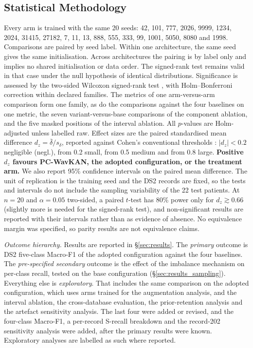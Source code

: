\documentclass[preprint,12pt]{elsarticle}
\begin{document}
\subsection{Statistical Methodology}
\label{sec:stats}
Every arm is trained with the same 20 seeds: 42, 101, 777, 2026, 9999, 1234, 2024, 31415, 27182, 7, 11, 13, 888, 555, 333, 99, 1001, 5050, 8080 and 1998. Comparisons are paired by seed label. Within one architecture, the same seed gives the same initialisation. Across architectures the pairing is by label only and implies no shared initialisation or data order. The signed-rank test remains valid in that case under the null hypothesis of identical distributions. Significance is assessed by the two-sided Wilcoxon signed-rank test \cite{wilcoxon_individual_1945}, with Holm--Bonferroni correction \cite{holm_simple_1979} within declared families. The metrics of one arm-versus-arm comparison form one family, as do the comparisons against the four baselines on one metric, the seven variant-versus-base comparisons of the component ablation, and the five masked positions of the interval ablation. All $p$-values are Holm-adjusted unless labelled raw. Effect sizes are the paired standardised mean difference $d_z = \bar\delta/s_\delta$, reported against Cohen's conventional thresholds \cite{cohen_statistical_1988}: $|d_z| < 0.2$ negligible (negl.), from 0.2 small, from 0.5 medium and from 0.8 large. \textbf{Positive $d_z$ favours PC-WavKAN, the adopted configuration, or the treatment arm.} We also report 95\% confidence intervals on the paired mean difference. The unit of replication is the training seed and the DS2 records are fixed, so the tests and intervals do not include the sampling variability of the 22 test patients. At $n = 20$ and $\alpha = 0.05$ two-sided, a paired $t$-test has 80\% power only for $d_z \gtrsim 0.66$ (slightly more is needed for the signed-rank test), and non-significant results are reported with their intervals rather than as evidence of absence. No equivalence margin was specified, so parity results are not equivalence claims.

\emph{Outcome hierarchy.} Results are reported in \S\ref{sec:results}. The \emph{primary} outcome is DS2 five-class Macro-F1 of the adopted configuration against the four baselines. The \emph{pre-specified secondary} outcome is the effect of the imbalance mechanism on per-class recall, tested on the base configuration (\S\ref{sec:results_sampling}). Everything else is \emph{exploratory}. That includes the same comparison on the adopted configuration, which uses arms trained for the augmentation analysis, and the interval ablation, the cross-database evaluation, the prior-retention analysis and the artefact sensitivity analysis. The last four were added or revised, and the four-class Macro-F1, a per-record S-recall breakdown and the record-202 sensitivity analysis were added, after the primary results were known. Exploratory analyses are labelled as such where reported.
\end{document}
